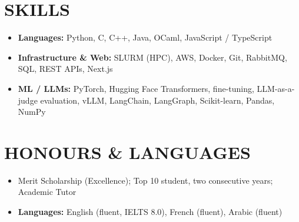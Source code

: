 \documentclass[10pt, a4paper]{article}
\begin{document}
\section*{SKILLS}
\begin{itemize}
    \item \textbf{Languages:} Python, C, C++, Java, OCaml, JavaScript / TypeScript
    \item \textbf{Infrastructure \& Web:} SLURM (HPC), AWS, Docker, Git, RabbitMQ, SQL, REST APIs, Next.js
    \item \textbf{ML / LLMs:} PyTorch, Hugging Face Transformers, fine-tuning, LLM-as-a-judge evaluation, vLLM, LangChain, LangGraph, Scikit-learn, Pandas, NumPy
\end{itemize}

\section*{HONOURS \& LANGUAGES}
\begin{itemize}
    \item Merit Scholarship (Excellence); Top 10 student, two consecutive years; Academic Tutor
    \item \textbf{Languages:} English (fluent, IELTS 8.0), French (fluent), Arabic (fluent)
\end{itemize}
\end{document}
